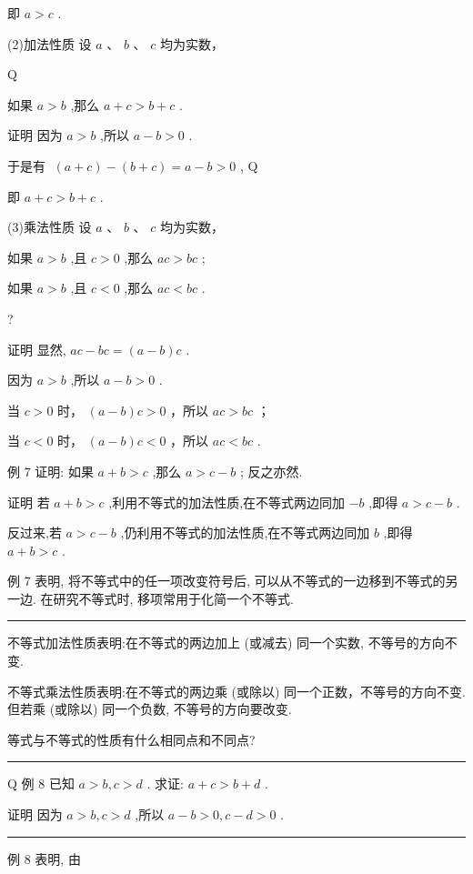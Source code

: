 \documentclass[10pt]{article}
\newcommand{\HRule}{\begin{center}\rule{0.9\linewidth}{0.2mm}\end{center}}
\begin{document}
即 \(a > c\) .

(2)加法性质 设 \(a\text{ 、 }b\text{ 、 }c\) 均为实数，

Q

如果 \(a > b\) ,那么 \(a + c > b + c\) .

证明 因为 \(a > b\) ,所以 \(a - b > 0\) .

于是有 \(\;\left( {a + c}\right)  - \left( {b + c}\right)  = a - b > 0\) , Q

即 \(a + c > b + c\) .

(3)乘法性质 设 \(a\text{ 、 }b\text{ 、 }c\) 均为实数，

如果 \(a > b\) ,且 \(c > 0\) ,那么 \({ac} > {bc}\) ;

如果 \(a > b\) ,且 \(c < 0\) ,那么 \({ac} < {bc}\) .

?

证明 显然, \({ac} - {bc} = \left( {a - b}\right) c\) .

因为 \(a > b\) ,所以 \(a - b > 0\) .

当 \(c > 0\) 时， \(\left( {a - b}\right) c > 0\) ，所以 \({ac} > {bc}\) ；

当 \(c < 0\) 时， \(\left( {a - b}\right) c < 0\) ，所以 \({ac} < {bc}\) .

例 7 证明: 如果 \(a + b > c\) ,那么 \(a > c - b\) ; 反之亦然.

证明 若 \(a + b > c\) ,利用不等式的加法性质,在不等式两边同加 \(- b\) ,即得 \(a > c - b\) .

反过来,若 \(a > c - b\) ,仍利用不等式的加法性质,在不等式两边同加 \(b\) ,即得 \(a + b > c\) .

例 7 表明, 将不等式中的任一项改变符号后, 可以从不等式的一边移到不等式的另一边. 在研究不等式时, 移项常用于化简一个不等式.



\HRule

不等式加法性质表明:在不等式的两边加上 (或减去) 同一个实数, 不等号的方向不变.

不等式乘法性质表明:在不等式的两边乘 (或除以) 同一个正数，不等号的方向不变. 但若乘 (或除以) 同一个负数, 不等号的方向要改变.

等式与不等式的性质有什么相同点和不同点?

\HRule



Q 例 8 已知 \(a > b,c > d\) . 求证: \(a + c > b + d\) .

证明 因为 \(a > b,c > d\) ,所以 \(a - b > 0,c - d > 0\) .

\HRule

例 8 表明, 由
\end{document}
